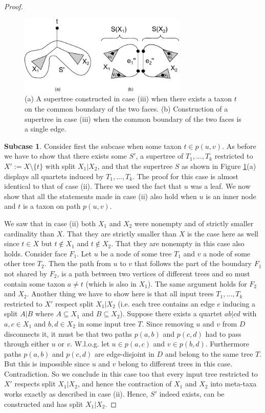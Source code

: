\begin{proof}
\begin{figure}[h]
 \begin{center}
  \includegraphics[width=8cm]{../figs/ch5/K4separatorCase3.pdf}
 \end{center} 
 \caption{(a) A supertree constructed in case (iii) when there exists a taxon $t$ on the common boundary of the two faces. (b) Construction of a supertree in case (iii) when the common boundary of the two faces is a single edge.}
 \label{fig:K4separatorCase3}
\end{figure}



\textbf{Subcase 1}. 
Consider first the subcase when some taxon $t \in p(u,v)$. As before we have to show that there exists some $S'$, a supertree of $T_1,...,T_k$ restricted to $X':= X \setminus \{t\}$ with split $X_1|X_2$, and that the supertree $S$ as shown in Figure \ref{fig:K4separatorCase3}(a) displays all quartets induced by $T_1,...,T_k$. The proof for this case is almost identical to that of case (ii). There we used the fact that $u$ was a leaf. We now show that all the statements made in case (ii) also hold when $u$ is an inner node and $t$ is a taxon on path $p(u,v)$. 

We saw that in case (ii) both $X_1$ and $X_2$ were nonempty and of strictly smaller cardinality than $X$. That they are strictly smaller than $X$ is the case here as well since $t\in X$ but $t \notin X_1$ and $t \notin X_2$. That they are nonempty in this case also holds. Consider face $F_1$. Let $u$ be a node of some tree $T_1$ and $v$ a node of some other tree $T_2$. Then the path from $u$ to $v$ that follows the part of the boundary $F_1$ not shared by $F_2$, is a path between two vertices of different trees and so must contain some taxon $a \neq t$ (which is also in $X_1$). The same argument holds for $F_2$ and $X_2$.  Another thing we have to show here is that all input trees $T_1,...,T_k$ restricted to $X'$ respect split $X_1|X_2$ (i.e. each tree contains an edge $e$ inducing a split $A|B$ where $A \subseteq X_1$ and $B \subseteq X_2$). Suppose there exists a quartet $ab|cd$ with $a,c \in X_1$ and $b,d \in X_2$ in some input tree $T$. Since removing $u$ and $v$ from $D$ disconnects it, it must be that two paths $p(a,b)$ and $p(c,d)$ had to pass through either $u$ or $v$. W.l.o.g. let $u \in p(a,c)$ and $v \in p(b,d)$. Furthermore paths $p(a,b)$ and $p(c,d)$ are edge-disjoint in $D$ and belong to the same tree $T$. But this is impossible since $u$ and $v$ belong to different trees in this case. Contradiction. So we conclude in this case too that every input tree restricted to $X'$ respects split $X_1|X_2$, and hence the contraction of $X_1$ and $X_2$ into meta-taxa works exactly as described in case (ii). Hence, $S'$ indeed exists, can be constructed and has split $X_1|X_2$.


\end{proof}
